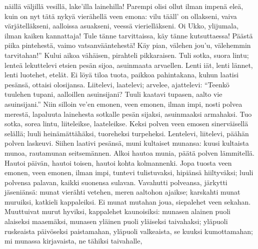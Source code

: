     näillä väljillä vesillä,
    lake'illa lainehilla!
  \endverse
  \beginverse
    Parempi olisi ollut
    ilman impenä eleä,
    kuin on nyt tätä nykyä
    vierähellä veen emona:
    vilu tääll' on ollakseni,
    vaiva värjätelläkseni,
    aalloissa asuakseni,
    veessä vierielläkseni.
    Oi Ukko, ylijumala,
    ilman kaiken kannattaja!
  \endverse
  \beginverse
    Tule tänne tarvittaissa,
    käy tänne kutsuttaessa!
    Päästä piika pintehestä,
    vaimo vatsanvääntehestä!
    Käy pian, välehen jou'u,
    välehemmin tarvitahan!''
  \endverse
  \beginverse
    Kului aikoa vähäisen,
    pirahteli pikkaraisen.
    Tuli sotka, suora lintu;
    lenteä lekuttelevi
  \endverse
  \beginverse
    etsien pesän sijoa,
    asuinmaata arvaellen.
    Lenti iät, lenti lännet,
    lenti luotehet, etelät.
    Ei löyä tiloa tuota,
    paikkoa pahintakana,
    kuhun laatisi pesänsä,
    ottaisi olosijansa.
  \endverse
  \beginverse
    Liitelevi, laatelevi;
    arvelee, ajattelevi:
  \endverse
  \beginverse
    ``Teenkö tuulehen tupani,
    aalloillen asuinsijani?
    Tuuli kaatavi tupasen,
    aalto vie asuinsijani.''
    Niin silloin ve'en emonen,
    veen emonen, ilman impi,
    nosti polvea merestä,
    lapaluuta lainehesta
    sotkalle pesän sijaksi,
    asuinmaaksi armahaksi.
  \endverse
  \beginverse
    Tuo sotka, sorea lintu,
    liiteleikse, laateleikse.
    Keksi polven veen emosen
    sinerväisellä selällä;
    luuli heinämättähäksi,
    tuoreheksi turpeheksi.
    Lentelevi, liitelevi,
    päähän polven laskeuvi.
    Siihen laativi pesänsä,
    muni kultaiset munansa:
  \endverse
  \beginverse
    kuusi kultaista munoa,
    rautamunan seitsemännen.
  \endverse
  \beginverse
    Alkoi hautoa munia,
    päätä polven lämmitellä.
    Hautoi päivän, hautoi toisen,
    hautoi kohta kolmannenki.
    Jopa tuosta veen emonen,
    veen emonen, ilman impi,
    tuntevi tulistuvaksi,
    hipiänsä hiiltyväksi;
  \endverse
  \beginverse
    luuli polvensa palavan,
    kaikki suonensa sulavan.
    Vavahutti polveansa,
    järkytti jäseniänsä:
    munat vierähti vetehen,
    meren aaltohon ajaikse;
    karskahti munat muruiksi,
    katkieli kappaleiksi.
  \endverse
  \beginverse
    Ei munat mutahan joua,
    siepalehet veen sekahan.
  \endverse
  \beginverse
    Muuttuivat murut hyviksi,
    kappalehet kaunoisiksi:
    munasen alainen puoli
    alaiseksi maaemäksi,
    munasen yläinen puoli
    yläiseksi taivahaksi;
    yläpuoli ruskeaista
    päivöseksi paistamahan,
    yläpuoli valkeaista,
    se kuuksi kumottamahan;
    mi munassa kirjavaista,
    ne tähiksi taivahalle,
